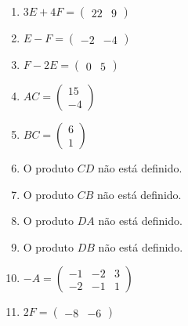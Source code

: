 \documentclass[12pt]{exam}
\begin{document}
\begin{exercicio}
\begin{solucao}
\begin{enumerate}[label={\alph*})]
        \item $3E + 4F = \begin{pmatrix} 22 & 9\end{pmatrix}$
        \item $E - F = \begin{pmatrix} -2 & -4\end{pmatrix}$
        \item $F - 2E = \begin{pmatrix} 0 & 5\end{pmatrix}$
        \item $AC = \begin{pmatrix} 15\\ -4\end{pmatrix}$
        \item $BC = \begin{pmatrix} 6\\1\end{pmatrix}$
        \item O produto $CD$ não está definido.
        \item O produto $CB$ não está definido.
        \item O produto $DA$ não está definido.
        \item O produto $DB$ não está definido.
        \item $-A = \begin{pmatrix} -1 & -2 & 3\\-2 & -1 & 1\end{pmatrix}$
        \item $2F = \begin{pmatrix} -8 & -6\end{pmatrix}$
    \end{enumerate}
  \end{solucao}
\end{exercicio}
\end{document}
